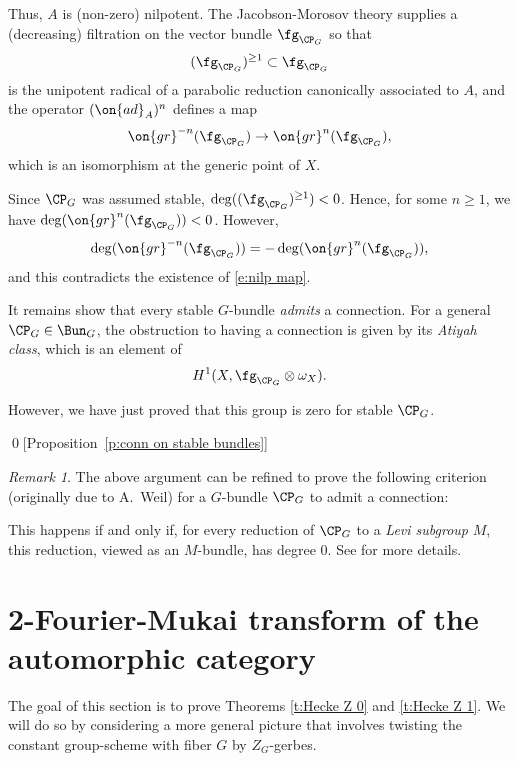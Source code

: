 \documentclass[9pt]{amsart}
\theoremstyle{remark}
\newtheorem{rem}[subsubsection]{Remark}
\theoremstyle{definition}
\theoremstyle{remark}
\newcommand{\propref}[1]{Proposition~\ref{#1}}
\numberwithin{equation}{section}
\begin{document}
\sssec{}

Thus, $A$ is (non-zero) nilpotent. The Jacobson-Morosov theory supplies a (decreasing) filtration on the vector
bundle $\fg_{\CP_G}$ so that $$(\fg_{\CP_G})^{\geq 1}\subset \fg_{\CP_G}$$
is the unipotent radical of a parabolic reduction canonically associated to $A$, and 
the operator $(\on{ad}_A)^n$ defines a map
\begin{equation} \label{e:nilp map}
\on{gr}^{-n}(\fg_{\CP_G})\to \on{gr}^n(\fg_{\CP_G}),
\end{equation} 
which is an isomorphism at the generic point of $X$.

\medskip

Since $\CP_G$ was assumed stable, $\deg((\fg_{\CP_G})^{\geq 1})<0$. Hence, for some $n\geq 1$, we have
$\deg(\on{gr}^n(\fg_{\CP_G}))<0$. However,
$$\deg(\on{gr}^{-n}(\fg_{\CP_G}))=-\deg(\on{gr}^n(\fg_{\CP_G})),$$
and this contradicts the existence of \eqref{e:nilp map}. 

\sssec{}

It remains show that every stable $G$-bundle \emph{admits} a connection. For a general $\CP_G\in \Bun_G$,
the obstruction to having a connection is given by its \emph{Atiyah class}, which is an element of
$$H^1(X,\fg_{\CP_G}\otimes \omega_X).$$

However, we have just proved that this group is zero
for stable $\CP_G$.

\qed[\propref{p:conn on stable bundles}]

\begin{rem}
The above argument can be refined to prove the following criterion (originally due to A.~Weil) for a $G$-bundle 
$\CP_G$ to admit a connection: 

\medskip

This happens if and only if, for every reduction of $\CP_G$ to a \emph{Levi subgroup} $M$, this reduction, viewed as
an $M$-bundle, has degree $0$. See \cite{AB} for more
details.

\end{rem}


\section{2-Fourier-Mukai transform of the automorphic category} \label{s:gerbes}

The goal of this section is to prove Theorems \ref{t:Hecke Z 0} and \ref{t:Hecke Z 1}. We will do
so by considering a more general picture that involves twisting the constant group-scheme with fiber $G$ by $Z_G$-gerbes.
\end{document}
